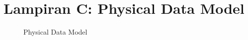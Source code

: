 \chapter{Lampiran C: Physical Data Model} \label{lampiran:pdm}
\begin{figure}[H]
	\caption{Physical Data Model}
\end{figure}
